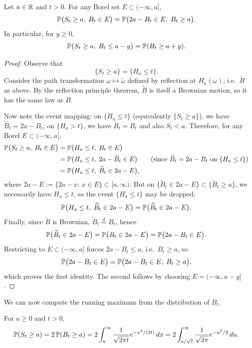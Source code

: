 \begin{proposition}
Let $a\in\mathbb{R}$ and $t>0$. For any Borel set $E\subset(-\infty,a]$,
\[
\mathbb{P}\bigl(S_t\ge a,\; B_t\in E\bigr)=\mathbb{P}\bigl(2a-B_t\in E,\; B_t\ge a\bigr).
\]
In particular, for $y\ge0$,
\[
\mathbb{P}\bigl(S_t\ge a,\; B_t\le a-y\bigr)=\mathbb{P}(B_t\ge a+y).
\]
\end{proposition}

\begin{proof}
Observe that \[
\{S_t\ge a\}=\{H_a\le t\}.
\]Consider the path transformation $\omega\mapsto \widetilde\omega$ defined by reflection at $H_a(\omega)$,
i.e.\ $\widetilde B$ as above. By the reflection principle theorem, $\widetilde B$ is itself a Brownian motion,
so it has the same law as $B$.

Now note the event mapping:
on $\{H_a\le t\}$ (equivalently $\{S_t\ge a\}$), we have $\widetilde B_t=2a-B_t$;
on $\{H_a>t\}$, we have $\widetilde B_t=B_t$ and also $S_t<a$.
Therefore, for any Borel $E\subset(-\infty,a]$,
\begin{align*}
\mathbb{P}\bigl(S_t\ge a,\; B_t\in E\bigr)
&=\mathbb{P}\bigl(H_a\le t,\; B_t\in E\bigr)\\
&=\mathbb{P}\bigl(H_a\le t,\; 2a-\widetilde B_t\in E\bigr)
\qquad (\text{since }\widetilde B_t=2a-B_t \text{ on }\{H_a\le t\})\\
&=\mathbb{P}\bigl(H_a\le t,\; \widetilde B_t\in 2a-E\bigr),
\end{align*}
where $2a-E:=\{2a-x:\,x\in E\}\subset[a,\infty)$.
But on $\{\widetilde B_t\in 2a-E\}\subset\{\widetilde B_t\ge a\}$, we necessarily have $H_a\le t$,
so the event $\{H_a\le t\}$ may be dropped:
\[
\mathbb{P}\bigl(H_a\le t,\; \widetilde B_t\in 2a-E\bigr)=\mathbb{P}\bigl(\widetilde B_t\in 2a-E\bigr).
\]
Finally, since $\widetilde B$ is Brownian, $\widetilde B_t\overset{d}=B_t$, hence
\[
\mathbb{P}\bigl(\widetilde B_t\in 2a-E\bigr)=\mathbb{P}\bigl(B_t\in 2a-E\bigr)
=\mathbb{P}\bigl(2a-B_t\in E\bigr).
\]
Restricting to $E\subset(-\infty,a]$ forces $2a-B_t\le a$, i.e.\ $B_t\ge a$, so
\[
\mathbb{P}\bigl(2a-B_t\in E\bigr)=\mathbb{P}\bigl(2a-B_t\in E,\; B_t\ge a\bigr),
\]
which proves the first identity. The second follows by choosing $E=(-\infty,a-y]$.
\end{proof}

We can now compute the running maximum from the distribution of $B_t$.

\begin{corollary}
For $a\ge0$ and $t>0$,
\[
\mathbb{P}(S_t\ge a)=2\,\mathbb{P}(B_t\ge a)
=2\int_{a}^{\infty}\frac{1}{\sqrt{2\pi t}}e^{-x^2/(2t)}\,dx
=2\int_{a/\sqrt t}^{\infty}\frac{1}{\sqrt{2\pi}}e^{-u^2/2}\,du.
\]
\end{corollary}

